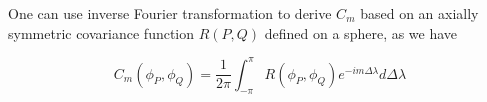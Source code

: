 				
		One can use inverse Fourier transformation to derive $C_m$ based on an axially symmetric covariance function $R(P,Q)$ defined on a sphere, as we have
				
		\[ 
			C_m(\phi_P, \phi_Q) = \frac{1}{2\pi}\int_{-\pi}^{\pi} R(\phi_P, \phi_Q)e^{-im\Delta\lambda} d\Delta\lambda \]
				
				
					
